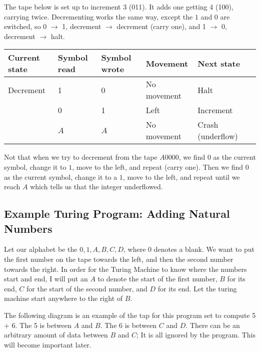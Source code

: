 \documentclass[11pt, letterpaper, twoside, openright]{book}
\begin{document}
The tape below is set up to increment 3 (011). It adds one getting 4 (100), carrying twice. Decrementing works the same way, except the $1$ and $0$ are switched, so 0 $\to$ 1, decrement $\to$ decrement (carry one), and 1 $\to$ 0,
decrement $\to$ halt.

\begin{tabular}{|l|l|l|l|l|l|}
\hline
Current state & Symbol read & Symbol wrote & Movement & Next state \\
\hline
Decrement & 1 & 0 & No movement & Halt \\
 & 0 & 1 & Left & Increment \\
 & $A$ & $A$ & No movement & Crash (underflow) \\
\hline
\end{tabular}

Not that when we try to decrement from the tape $A0000$, we find $0$ as the current symbol, change it to $1$, move to the left, and repeat (carry one). Then we find $0$ as the current symbol, change it to a $1$, move to the left, and repeat until we reach $A$ which tells us that the integer underflowed.

\subsection{Example Turing Program: Adding Natural Numbers}
Let our alphabet be the ${0, 1, A, B, C, D}$, where $0$ denotes a blank. We want to put the first number on the tape towards the left, and then the second number towards the right. In order for the Turing Machine to know where the numbers start and end, I will put an $A$ to denote the start of the first number, $B$ for its end, $C$ for the start of the second number, and $D$ for its end. Let the turing machine start anywhere to the right of $B$.

The following diagram is an example of the tap for this program set to compute 5 + 6. The 5 is between $A$ and $B$. The 6 is between $C$ and $D$. There can be an arbitrary amount of data between $B$ and $C$; It is all ignored by the program. This will become important later.

\end{document}
